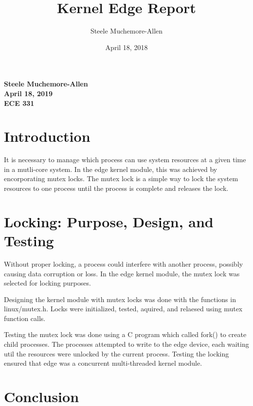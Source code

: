 \documentclass[12pt]{article}
\title{Kernel Edge Report}
\author{Steele Muchemore-Allen}
\date{April 18, 2018}
\begin{document}
 \begin{center}
         
    \textbf{\large{Steele Muchemore-Allen}}\\
    \textbf{\large{April 18, 2019}}\\
    \textbf{\large{ECE 331}}\\
 \end{center}

 \section*{Introduction}
 \begin{FlushLeft}
 	\begin{spacing}{2}
     It is necessary to manage which process can use system resources at a given time in a mutli-core system. In the edge kernel module, this was achieved by encorporating mutex locks. The mutex lock is a simple way to lock the system resources to one process until the process is complete and releases the lock.
     \end{spacing}
 \end{FlushLeft}
 \section*{Locking:  Purpose, Design, and Testing}

 \begin{FlushLeft}
 	\begin{spacing}{2}
     Without proper locking, a process could interfere with another process, possibly causing data corruption or loss. In the edge kernel module, the mutex lock was selected for locking purposes. \vspace{12pt}
     
     Designing the kernel module with mutex locks was done with the functions in linux/mutex.h. Locks were initialized, tested, aquired, and relaesed using mutex function calls.\vspace{12pt}
     
     Testing the mutex lock was done using a C program which called fork() to create child processes. The processes attempted to write to the edge device, each waiting util the resources were unlocked by the current process. Testing the locking ensured that edge was a concurrent multi-threaded kernel module.
	\end{spacing}
 \end{FlushLeft}

 \section*{Conclusion}
\end{document}
